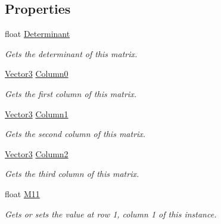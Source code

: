 \subsection*{Properties}
\begin{DoxyCompactItemize}
\item 
float \hyperlink{struct_open_t_k_1_1_matrix3_aeea92fa70019761049f0294d2c41eab5}{Determinant}
\begin{DoxyCompactList}\small\item\em Gets the determinant of this matrix. \end{DoxyCompactList}\item 
\hyperlink{struct_open_t_k_1_1_vector3}{Vector3} \hyperlink{struct_open_t_k_1_1_matrix3_ad98e691ae5df22b80abada58460f4e5a}{Column0}
\begin{DoxyCompactList}\small\item\em Gets the first column of this matrix. \end{DoxyCompactList}\item 
\hyperlink{struct_open_t_k_1_1_vector3}{Vector3} \hyperlink{struct_open_t_k_1_1_matrix3_a8863bccfc81bce7def87f1b422b213c8}{Column1}
\begin{DoxyCompactList}\small\item\em Gets the second column of this matrix. \end{DoxyCompactList}\item 
\hyperlink{struct_open_t_k_1_1_vector3}{Vector3} \hyperlink{struct_open_t_k_1_1_matrix3_a2d6de46f12e7506d253cd60031d609fd}{Column2}
\begin{DoxyCompactList}\small\item\em Gets the third column of this matrix. \end{DoxyCompactList}\item 
float \hyperlink{struct_open_t_k_1_1_matrix3_a80348732cc3e3796931427d057524684}{M11}
\begin{DoxyCompactList}\small\item\em Gets or sets the value at row 1, column 1 of this instance. \end{DoxyCompactList}\item 

\end{DoxyCompactItemize}
